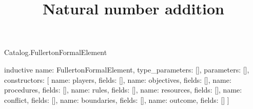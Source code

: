 \begin{lexlean}{Catalog.FullertonFormalElement}
\title{Natural number addition}
\begin{semanticmodule}
inductive{
  name: FullertonFormalElement,
  type_parameters: [],
  parameters: [],
  constructors: [
    {name: players, fields: []},
    {name: objectives, fields: []},
    {name: procedures, fields: []},
    {name: rules, fields: []},
    {name: resources, fields: []},
    {name: conflict, fields: []},
    {name: boundaries, fields: []},
    {name: outcome, fields: []}
  ]
}
\end{semanticmodule}
\end{lexlean}
